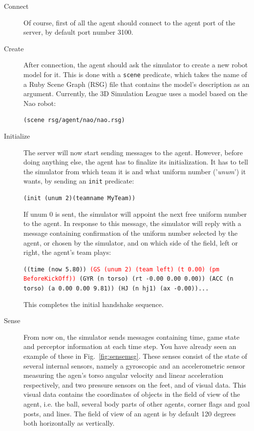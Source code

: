 \begin{description}
\item[Connect] Of course, first of all the agent should connect to the
  agent port of the server, by default port number 3100.
\item[Create] After connection, the agent should ask the simulator to
  create a new robot model for it. This is done with a {\tt scene}
  predicate, which takes the name of a Ruby Scene Graph (RSG) file
  that contains the model's description as an argument. Currently, the
  3D Simulation League uses a model based on the Nao robot:
	
	{\tt (scene rsg/agent/nao/nao.rsg)}
      \item[Initialize] The server will now start sending messages to
        the agent. However, before doing anything else, the agent has
        to finalize its initialization. It has to tell the simulator
        from which team it is and what uniform number ('\emph{unum}')
        it wants, by sending an {\tt init} predicate:
	
	{\tt (init (unum 2)(teamname MyTeam))}
	
	If unum 0 is sent, the simulator will appoint the next free
        uniform number to the agent. In response to this message, the
        simulator will reply with a message containing confirmation of
        the uniform number selected by the agent, or chosen by the
        simulator, and on which side of the field, left or right, the
        agent's team plays:
	
	{\tt ((time (now 5.80)) \textcolor{Red}{(GS (unum 2) (team left) (t 0.00) (pm BeforeKickOff))} (GYR (n torso) (rt -0.00 0.00 0.00)) (ACC (n torso) (a 0.00 0.00 9.81)) (HJ (n hj1) (ax -0.00))... }
	
	This completes the initial handshake sequence.
	
      \item[Sense] From now on, the simulator sends messages
        containing time, game state and perceptor information at each
        time step. You have already seen an example of these in
        Fig.~\ref{fig:sensemsg}. These senses consist of the state of
        several internal sensors, namely a gyroscopic and an
        accelerometric sensor measuring the agen's torso angular
        velocity and linear acceleration respectively, and two
        pressure sensors on the feet, and of visual data. This visual
        data contains the coordinates of objects in the field of view
        of the agent, i.e. the ball, several body parts of other
        agents, corner flags and goal posts, and lines. The field of
        view of an agent is by default 120 degrees both horizontally
        as vertically.
	

\end{description}
